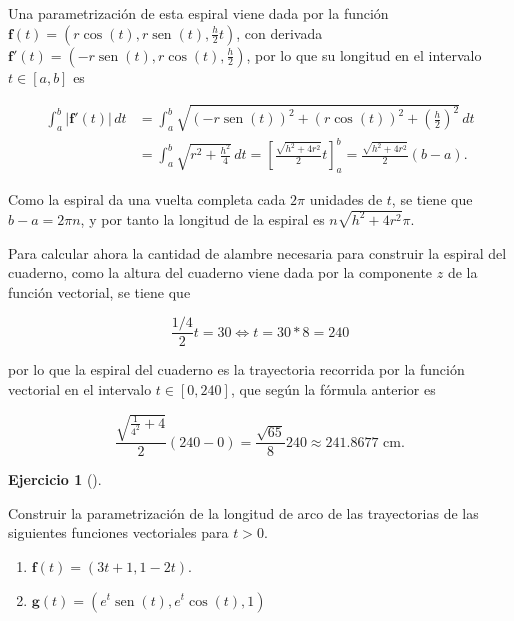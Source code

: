 \documentclass[
  a4paper,
]{scrreport}
\theoremstyle{definition}
\newtheorem{exercise}{Ejercicio}[chapter]
\theoremstyle{remark}
\begin{document}
\begin{tcolorbox}[enhanced jigsaw, coltitle=black, toptitle=1mm, colframe=quarto-callout-tip-color-frame, colbacktitle=quarto-callout-tip-color!10!white, breakable, opacityback=0, bottomtitle=1mm, opacitybacktitle=0.6, title=\textcolor{quarto-callout-tip-color}{\faLightbulb}\hspace{0.5em}{Solución}, arc=.35mm, leftrule=.75mm, toprule=.15mm, titlerule=0mm, bottomrule=.15mm, left=2mm, rightrule=.15mm, colback=white]

Una parametrización de esta espiral viene dada por la función
\(\mathbf{f}(t) = (r\cos(t),r\operatorname{sen}(t),\frac{h}{2}t)\), con
derivada
\(\mathbf{f}'(t) = (-r\operatorname{sen}(t),r\cos(t), \frac{h}{2})\),
por lo que su longitud en el intervalo \(t\in[a,b]\) es

\begin{align*}
\int_a^b |\mathbf{f}'(t)|\,dt 
&= \int_a^b \sqrt{(-r\operatorname{sen}(t))^2+(r\cos(t))^2+\left(\frac{h}{2}\right)^2}\, dt \\
&= \int_a^b \sqrt{r^2+\frac{h^2}{4}}\, dt 
= \left[\frac{\sqrt{h^2+4r^2}}{2}t\right]_a^b
= \frac{\sqrt{h^2+4r^2}}{2}(b-a).
\end{align*}

Como la espiral da una vuelta completa cada \(2\pi\) unidades de \(t\),
se tiene que \(b-a=2\pi n\), y por tanto la longitud de la espiral es
\(n\sqrt{h^2+4r^2}\pi\).

Para calcular ahora la cantidad de alambre necesaria para construir la
espiral del cuaderno, como la altura del cuaderno viene dada por la
componente \(z\) de la función vectorial, se tiene que

\[
\frac{1/4}{2}t = 30 \Leftrightarrow t = 30 * 8 = 240
\]

por lo que la espiral del cuaderno es la trayectoria recorrida por la
función vectorial en el intervalo \(t\in [0,240]\), que según la fórmula
anterior es

\[
\frac{\sqrt{\frac{1}{4^2}+4}}{2}(240-0) = \frac{\sqrt{65}}{8}240 \approx 241.8677 \mbox{ cm}. 
\]

\end{tcolorbox}

\begin{exercise}[]\protect\hypertarget{exr-parametrizacion-longitud-arco}{}\label{exr-parametrizacion-longitud-arco}

Construir la parametrización de la longitud de arco de las trayectorias
de las siguientes funciones vectoriales para \(t>0\).

\begin{enumerate}
\def\labelenumi{\alph{enumi}.}
\item
  \(\mathbf{f}(t)=(3t+1, 1-2t).\)
\item
  \(\mathbf{g}(t)=(e^t\operatorname{sen}(t), e^t\cos(t), 1)\)
\end{enumerate}

\end{exercise}
\end{document}
